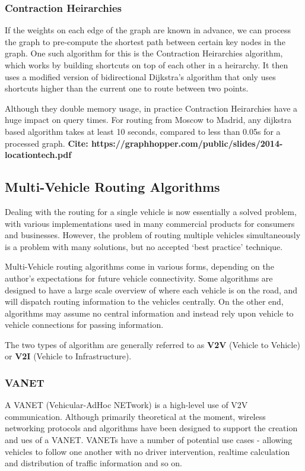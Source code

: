 \documentclass[ %
                    author={Alexander Hill},
                supervisor={Dr. Benjamin Sach},
                    degree={MEng},
                     title={MARMOSET},
                  subtitle={Multi-Agent Route Management using Online Simulation for Efficient Transportation},
                      type={research},
                      year={2016} ]{dissertation}
\begin{document}
\subsubsection{Contraction Heirarchies}

If the weights on each edge of the graph are known in advance, we can process
the graph to pre-compute the shortest path between certain key nodes in the
graph. One such algorithm for this is the Contraction Heirarchies algorithm,
which works by building shortcuts on top of each other in a heirarchy. It then
uses a modified version of bidirectional Dijkstra's algorithm that only uses
shortcuts higher than the current one to route between two points.

Although they double memory usage, in practice Contraction Heirarchies have a
huge impact on query times. For routing from Moscow to Madrid, any dijkstra
based algorithm takes at least 10 seconds, compared to less than 0.05s for a
processed graph.
\textbf{Cite: https://graphhopper.com/public/slides/2014-locationtech.pdf}

\subsection{Multi-Vehicle Routing Algorithms}

Dealing with the routing for a single vehicle is now essentially a solved
problem, with various implementations used in many commercial products for
consumers and businesses. However, the problem of routing multiple vehicles
simultaneously is a problem with many solutions, but no accepted `best practice'
technique.

Multi-Vehicle routing algorithms come in various forms, depending on the
author's expectations for future vehicle connectivity. Some algorithms are
designed to have a large scale overview of where each vehicle is on the road,
and will dispatch routing information to the vehicles centrally. On the other
end, algorithms may assume no central information and instead rely upon vehicle
to vehicle connections for passing information.

The two types of algorithm are generally referred to as \textbf{V2V} (Vehicle to
Vehicle) or \textbf{V2I} (Vehicle to Infrastructure).

\subsubsection{VANET}

A VANET (Vehicular-AdHoc NETwork) is a high-level use of V2V communication.
Although primarily theoretical at the moment, wireless networking protocols and
algorithms have been designed to support the creation and ues of a VANET. VANETs
have a number of potential use cases - allowing vehicles to follow one another
with no driver intervention, realtime calculation and distribution of traffic
information and so on.
\end{document}
